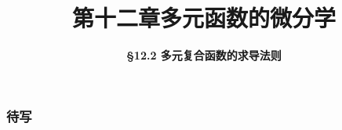 \everymath{\displaystyle}



\title[第十二章\\
多元微分学]{\texorpdfstring{\LARGE \bfseries 第十二章\quad 多元函数的微分学}{第十二章 多元函数的微分学}} %
\author[\smaller \S 12.2\\
复合函数求导法则] %
{\Large \bfseries \S 12.2 多元复合函数的求导法则}
\date{}





\begin{frame}

\titlepage %

\end{frame}



\begin{frame}
\frametitle{待写}

\end{frame}



